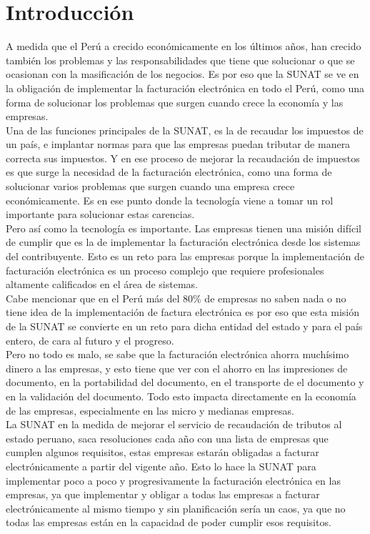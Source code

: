 \chapter*{Introducción}

A medida que el Perú a crecido económicamente en los últimos años, han crecido también los problemas y las responsabilidades que tiene que solucionar o que se ocasionan con la masificación de los negocios. Es por eso que la SUNAT se ve en la obligación de implementar la facturación electrónica en todo el Perú, como una forma de solucionar los problemas que surgen cuando crece la economía y las empresas.\\

Una de las funciones principales de la SUNAT, es la de recaudar los impuestos de un país, e implantar normas para que las empresas puedan tributar de manera correcta sus impuestos. Y en ese proceso de mejorar la recaudación de impuestos es que surge la necesidad de la facturación electrónica, como una forma de solucionar varios problemas que surgen cuando una empresa crece económicamente. Es en ese punto donde la tecnología viene a tomar un rol importante para solucionar estas carencias.\\

Pero así como la tecnología es importante. Las empresas tienen una misión difícil de cumplir que es la de implementar la facturación electrónica desde los sistemas del contribuyente. Esto es un reto para las empresas porque la implementación de facturación electrónica es un proceso complejo que requiere profesionales altamente calificados en el área de sistemas. \\

Cabe mencionar que en el Perú más del 80\% de empresas no saben nada o no tiene idea de la implementación de factura electrónica es por eso que esta misión de la SUNAT se convierte en un reto para dicha entidad del estado y para el país entero, de cara al futuro y el progreso.\\

Pero no todo es malo, se sabe que la facturación electrónica ahorra muchísimo dinero a las empresas, y esto tiene que ver con el ahorro en las impresiones de documento, en la portabilidad del documento, en el transporte de el documento y en la validación del documento. Todo esto impacta directamente en la economía de las empresas, especialmente en las micro y medianas empresas.\\

La SUNAT en la medida de mejorar el servicio de recaudación de tributos al estado peruano, saca resoluciones cada año con una lista de empresas que cumplen algunos requisitos, estas empresas estarán obligadas a facturar electrónicamente a partir del vigente año. Esto lo hace la SUNAT para implementar poco a poco y progresivamente la facturación electrónica en las empresas, ya que implementar y obligar a todas las empresas a facturar electrónicamente al mismo tiempo y sin planificación sería un caos, ya que no todas las empresas están en la capacidad de poder cumplir esos requisitos.\\

